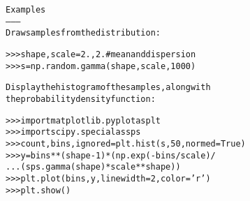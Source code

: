 \begin{boxedminipage}{\funcwidth}
\begin{alltt}
Examples
--------
Draw samples from the distribution:

{\textgreater}{\textgreater}{\textgreater} shape, scale = 2., 2. \# mean and dispersion
{\textgreater}{\textgreater}{\textgreater} s = np.random.gamma(shape, scale, 1000)

Display the histogram of the samples, along with
the probability density function:

{\textgreater}{\textgreater}{\textgreater} import matplotlib.pyplot as plt
{\textgreater}{\textgreater}{\textgreater} import scipy.special as sps
{\textgreater}{\textgreater}{\textgreater} count, bins, ignored = plt.hist(s, 50, normed=True)
{\textgreater}{\textgreater}{\textgreater} y = bins**(shape-1)*(np.exp(-bins/scale) /
...                      (sps.gamma(shape)*scale**shape))
{\textgreater}{\textgreater}{\textgreater} plt.plot(bins, y, linewidth=2, color='r')
{\textgreater}{\textgreater}{\textgreater} plt.show()
\end{alltt}

\setlength{\parskip}{1ex}
    \end{boxedminipage}

    \label{trunk:qstkutil:bollinger:geometric}

    \vspace{0.5ex}

